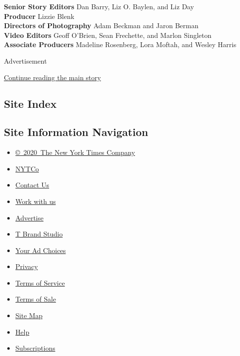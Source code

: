 \textbf{Senior Story Editors} Dan Barry, Liz O. Baylen, and Liz Day\\
\textbf{Producer} Lizzie Blenk\\
\textbf{Directors of Photography} Adam Beckman and Jaron Berman\\
\textbf{Video Editors} Geoff O'Brien, Sean Frechette, and Marlon
Singleton\\
\textbf{Associate Producers} Madeline Rosenberg, Lora Moftah, and Wesley
Harris

Advertisement

\protect\hyperlink{after-bottom}{Continue reading the main story}

\hypertarget{site-index}{%
\subsection{Site Index}\label{site-index}}

\hypertarget{site-information-navigation}{%
\subsection{Site Information
Navigation}\label{site-information-navigation}}

\begin{itemize}
\tightlist
\item
  \href{https://help.nytimes3xbfgragh.onion/hc/en-us/articles/115014792127-Copyright-notice}{©~2020~The
  New York Times Company}
\end{itemize}

\begin{itemize}
\tightlist
\item
  \href{https://www.nytco.com/}{NYTCo}
\item
  \href{https://help.nytimes3xbfgragh.onion/hc/en-us/articles/115015385887-Contact-Us}{Contact
  Us}
\item
  \href{https://www.nytco.com/careers/}{Work with us}
\item
  \href{https://nytmediakit.com/}{Advertise}
\item
  \href{http://www.tbrandstudio.com/}{T Brand Studio}
\item
  \href{https://www.nytimes3xbfgragh.onion/privacy/cookie-policy\#how-do-i-manage-trackers}{Your
  Ad Choices}
\item
  \href{https://www.nytimes3xbfgragh.onion/privacy}{Privacy}
\item
  \href{https://help.nytimes3xbfgragh.onion/hc/en-us/articles/115014893428-Terms-of-service}{Terms
  of Service}
\item
  \href{https://help.nytimes3xbfgragh.onion/hc/en-us/articles/115014893968-Terms-of-sale}{Terms
  of Sale}
\item
  \href{https://spiderbites.nytimes3xbfgragh.onion}{Site Map}
\item
  \href{https://help.nytimes3xbfgragh.onion/hc/en-us}{Help}
\item
  \href{https://www.nytimes3xbfgragh.onion/subscription?campaignId=37WXW}{Subscriptions}
\end{itemize}
